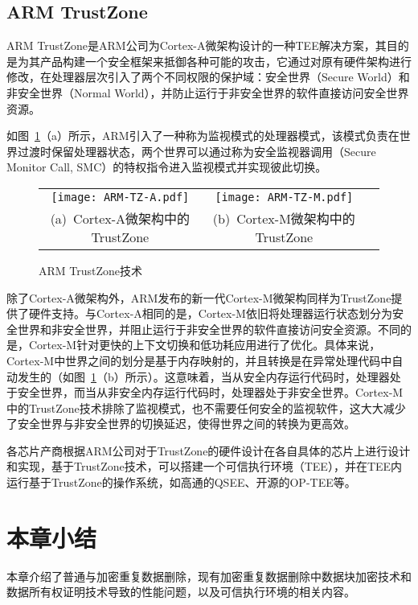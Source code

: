 \subsection{ARM TrustZone}
\label{subsec:background-tee-tz}

ARM TrustZone\cite{trustzone}是ARM公司为Cortex-A微架构\cite{cortex-a}设计的一种TEE解决方案，其目的是为其产品构建一个安全框架来抵御各种可能的攻击，它通过对原有硬件架构进行修改，在处理器层次引入了两个不同权限的保护域：安全世界（Secure World）和非安全世界（Normal World），并防止运行于非安全世界的软件直接访问安全世界资源。

如图~\ref{fig:ARM-TZ-base}（a）所示，ARM引入了一种称为监视模式的处理器模式，该模式负责在世界过渡时保留处理器状态，两个世界可以通过称为安全监视器调用（Secure Monitor Call, SMC）的特权指令进入监视模式并实现彼此切换。

\begin{figure}[!htb]
    \small
    \centering
    \begin{tabular}{@{}c@{}c@{}c}
        \texttt{[image: ARM-TZ-A.pdf]} &
        \hspace{5pt}
        \texttt{[image: ARM-TZ-M.pdf]}\\
        \mbox{\small (a) Cortex-A微架构中的TrustZone} &
        \mbox{\small (b) Cortex-M微架构中的TrustZone}\\
    \end{tabular}
    \caption{ARM TrustZone技术} 
    \label{fig:ARM-TZ-base}
\end{figure}

除了Cortex-A微架构外，ARM发布的新一代Cortex-M微架构\cite{cortex-m}同样为TrustZone提供了硬件支持。与Cortex-A相同的是，Cortex-M依旧将处理器运行状态划分为安全世界和非安全世界，并阻止运行于非安全世界的软件直接访问安全资源。不同的是，Cortex-M针对更快的上下文切换和低功耗应用进行了优化。具体来说，Cortex-M中世界之间的划分是基于内存映射的，并且转换是在异常处理代码中自动发生的（如图~\ref{fig:ARM-TZ-base}（b）所示）。这意味着，当从安全内存运行代码时，处理器处于安全世界，而当从非安全内存运行代码时，处理器处于非安全世界。Cortex-M中的TrustZone技术排除了监视模式，也不需要任何安全的监视软件，这大大减少了安全世界与非安全世界的切换延迟，使得世界之间的转换为更高效。

各芯片产商根据ARM公司对于TrustZone的硬件设计在各自具体的芯片上进行设计和实现，基于TrustZone技术，可以搭建一个可信执行环境（TEE），并在TEE内运行基于TrustZone的操作系统，如高通的QSEE、开源的OP-TEE等。

\section{本章小结}

本章介绍了普通与加密重复数据删除，现有加密重复数据删除中数据块加密技术和数据所有权证明技术导致的性能问题，以及可信执行环境的相关内容。
